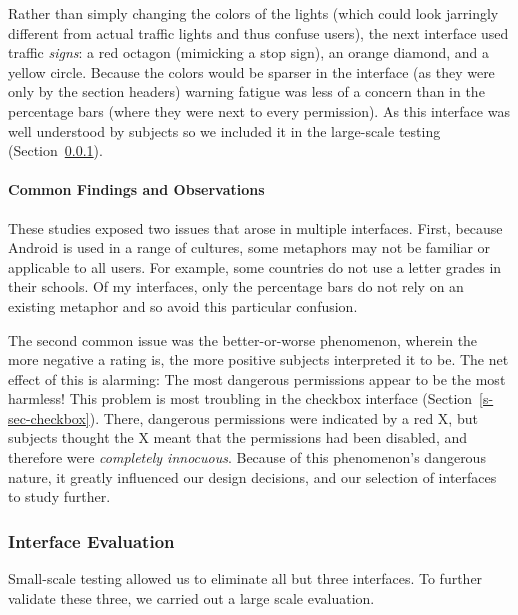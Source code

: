 \documentclass[11pt]{article}
\newcommand{\refsec}[1]{Section~\ref{#1}}
\begin{document}
\label{ss-sec-traffic-r4}

Rather than simply changing the colors of
the lights (which  
could look jarringly different from actual traffic lights and thus confuse users), 
the next interface used traffic \emph{signs}: a red octagon
(mimicking a stop sign), an orange diamond, and a yellow circle. 
Because the colors would be sparser in the interface (as they were only by the section 
headers) warning fatigue was less of
a concern than in the percentage bars 
(where they were next to every permission). 
As this interface was well understood by subjects so we included it
in the large-scale testing (\refsec{s-sec-largescale}).


\paragraph{Common Findings and Observations}
\label{common-findings}

These studies exposed two issues that arose in multiple 
interfaces. First, because Android is used in a range of 
cultures, some metaphors may not be familiar or applicable to all users.
For example, some countries 
do not use a letter grades in their schools.
Of my
interfaces, only the percentage bars do 
not rely on an existing metaphor and so avoid this particular confusion.

The second common issue was the better-or-worse phenomenon, 
wherein the more negative a rating is, the more positive subjects interpreted 
it to be. The net effect of this is alarming: The most dangerous permissions 
appear to be the most harmless! This problem is 
most troubling in the checkbox interface (\refsec{s-sec-checkbox}). 
There, dangerous permissions were indicated by a red X, but 
subjects thought the X meant that the permissions had been disabled, and therefore 
were \emph{completely innocuous}. Because of this phenomenon's dangerous nature, it greatly 
influenced our design decisions, and our selection of interfaces to study further.



\subsubsection{Interface Evaluation}
\label{s-sec-largescale}

Small-scale testing allowed us to eliminate all but three interfaces. 
To further validate these three, we carried out a large scale evaluation.
\end{document}
